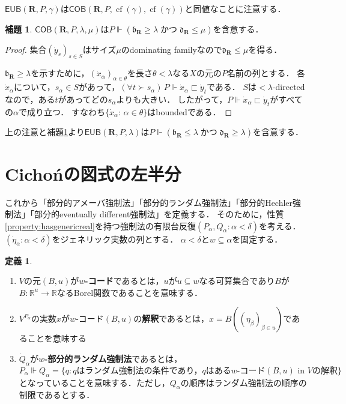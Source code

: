 \documentclass[uplatex,dvipdfmx]{jsarticle}
\newcommand{\R}{\mathbb{R}}
\newcommand\forces{\Vdash}
\newcommand{\AND}{\mathbin{\text{かつ}}}
\newcommand{\frakb}{\mathfrak{b}}
\newcommand{\frakd}{\mathfrak{d}}
\newcommand{\cf}{\operatorname{cf}}
\newcommand{\EUB}{\mathsf{EUB}}
\newcommand{\COB}{\mathsf{COB}}
\newcommand{\relR}{\mathbf{R}}
\renewcommand\subset{\subseteq}
\theoremstyle{definition}
\newtheorem{defi}[thm]{定義}
\newtheorem{lem}[thm]{補題}
\begin{document}
	$\EUB(\relR, P, \gamma)$は$\COB(\relR, P, \cf(\gamma), \cf(\gamma))$と同値なことに注意する．
	
	\begin{lem}\label{lem:cobimpliesineq}
		$\COB(\relR, P, \lambda, \mu)$は$P \forces (\frakb_\relR \ge \lambda \AND \frakd_\relR \le \mu)$を含意する．
	\end{lem}
	\begin{proof}
		集合$(\dot{y}_s)_{s\in S}$はサイズ$\mu$のdominating familyなので$\mathfrak{d}_\relR\le \mu$を得る．

		$\mathfrak{b}_\relR \ge \lambda$を示すために，$(\dot{x}_\alpha)_{\alpha\in\theta}$を長さ$\theta<\lambda$なる$X$の元の$P$名前の列とする．
		各$\dot{x}_\alpha$について，$s_\alpha\in S$があって，$(\forall t\succ s_\alpha)\, P\forces \dot{x}_\alpha \sqsubset \dot{y}_t$である．
		$S$は${<}\lambda$-directedなので，ある$t$があってどの$s_\alpha$よりも大きい．
		したがって，$P\forces \dot{x}_\alpha \sqsubset \dot{y}_t $がすべての$\alpha$で成り立つ．
		すなわち$\{\dot{x}_\alpha:\, \alpha\in\theta\}$はboundedである．
	\end{proof}

	上の注意と補題\ref{lem:cobimpliesineq}より$\EUB(\relR, P, \lambda)$は$P \forces (\frakb_\relR \le \lambda \AND \frakd_\relR \ge \lambda)$を含意する．
	
	\section{Cichońの図式の左半分}

	これから「部分的アメーバ強制法」「部分的ランダム強制法」「部分的Hechler強制法」「部分的eventually different強制法」を定義する．
	そのために，性質\ref{property:hasgenericreal}を持つ強制法の有限台反復$(P_\alpha, Q_\alpha : \alpha < \delta)$を考える．
	$(\dot{\eta}_\alpha : \alpha < \delta)$をジェネリック実数の列とする．
	$\alpha < \delta$と$w \subset \alpha$を固定する．

	\begin{defi}
		\begin{enumerate}
		\item $V$の元$(B, u)$が\textbf{$w$-コード}であるとは，$u$が$u \subset w$なる可算集合であり$B$が$B \colon \R^u \to \R$なるBorel関数であることを意味する．
		\item $V^{P_\alpha}$の実数$x$が$w$-コード$(B, u)$の\textbf{解釈}であるとは，$x = B((\eta_\beta)_{\beta \in u})$であることを意味する
		\item $\dot{Q}_\alpha$が\textbf{$w$-部分的ランダム強制法}であるとは，
		\[
			P_\alpha \forces Q_\alpha = \{ q : q \text{はランダム強制法の条件であり，}q\text{はある}w\text{-コード}(B, u)\text{ in }V\text{の解釈}\}	
		\]
		となっていることを意味する．ただし，$Q_\alpha$の順序はランダム強制法の順序の制限であるとする．
		\end{enumerate}
	\end{defi}
\end{document}

